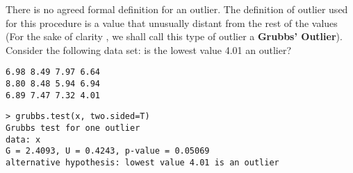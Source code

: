 \noindent There is no agreed formal definition for an outlier. The definition of outlier used for this procedure is a value that unusually distant from the rest of the values (For the sake of clarity , we shall call this type of outlier a \textbf{Grubbs' Outlier}). Consider the following data set: is the lowest value 4.01 an outlier?
\begin{center}
\begin{verbatim}
6.98 8.49 7.97 6.64
8.80 8.48 5.94 6.94
6.89 7.47 7.32 4.01
\end{verbatim}
\end{center}


\begin{framed}
\begin{verbatim}
> grubbs.test(x, two.sided=T)
Grubbs test for one outlier
data: x
G = 2.4093, U = 0.4243, p-value = 0.05069
alternative hypothesis: lowest value 4.01 is an outlier
\end{verbatim}
\end{framed}

